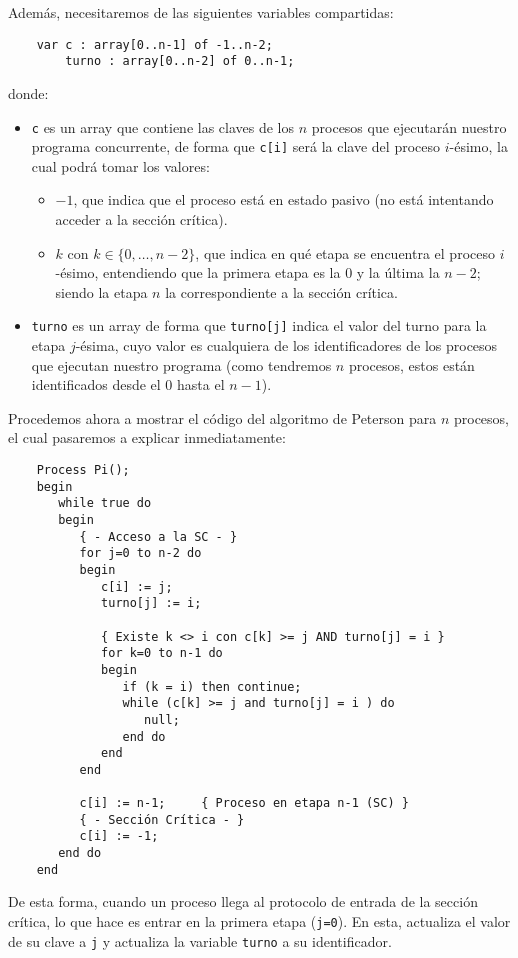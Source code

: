 Además, necesitaremos de las siguientes variables compartidas:
\begin{verbatim}
    var c : array[0..n-1] of -1..n-2;
        turno : array[0..n-2] of 0..n-1;
\end{verbatim}
donde:
\begin{itemize}
    \item \verb|c| es un array que contiene las claves de los $n$ procesos que ejecutarán nuestro programa concurrente, de forma que \verb|c[i]| será la clave del proceso $i$-ésimo, la cual podrá tomar los valores:
        \begin{itemize}
            \item $-1$, que indica que el proceso está en estado pasivo (no está intentando acceder a la sección crítica).
            \item $k$ con $k \in \{0,\ldots,n-2\}$, que indica en qué etapa se encuentra el proceso $i$-ésimo, entendiendo que la primera etapa es la $0$ y la última la $n-2$; siendo la etapa $n$ la correspondiente a la sección crítica.
        \end{itemize}
    \item \verb|turno| es un array de forma que \verb|turno[j]| indica el valor del turno para la etapa $j$-ésima, cuyo valor es cualquiera de los identificadores de los procesos que ejecutan nuestro programa (como tendremos $n$ procesos, estos están identificados desde el $0$ hasta el $n-1$).
\end{itemize}
Procedemos ahora a mostrar el código del algoritmo de Peterson para $n$ procesos, el cual pasaremos a explicar inmediatamente:
\begin{verbatim}
    Process Pi();
    begin
       while true do
       begin
          { - Acceso a la SC - }
          for j=0 to n-2 do
          begin
             c[i] := j;
             turno[j] := i;

             { Existe k <> i con c[k] >= j AND turno[j] = i }
             for k=0 to n-1 do
             begin
                if (k = i) then continue;
                while (c[k] >= j and turno[j] = i ) do
                   null;
                end do
             end
          end

          c[i] := n-1;     { Proceso en etapa n-1 (SC) }
          { - Sección Crítica - }
          c[i] := -1;
       end do
    end
\end{verbatim}
De esta forma, cuando un proceso llega al protocolo de entrada de la sección crítica, lo que hace es entrar en la primera etapa (\verb|j=0|). En esta, actualiza el valor de su clave a \verb|j| y actualiza la variable \verb|turno| a su identificador.

